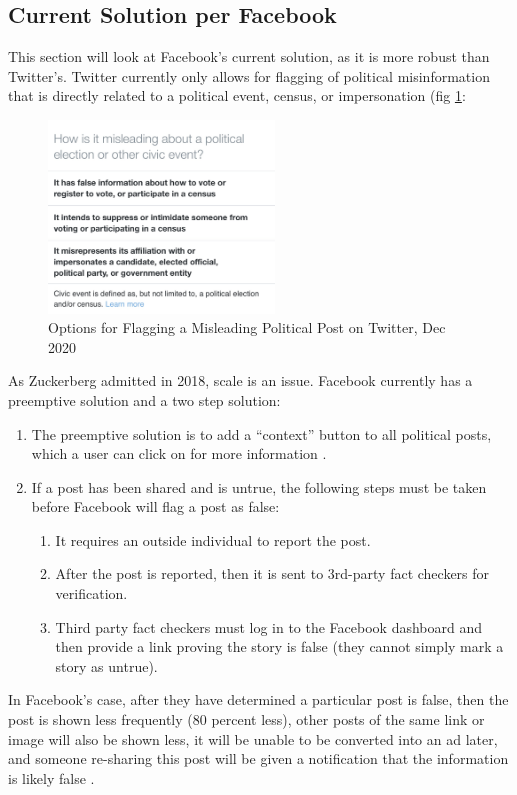 \documentclass[NETN,manuscript]{stjour-new}
\begin{document}
\subsection{Current Solution per Facebook}
This section will look at Facebook's current solution, as it is more robust than Twitter's. Twitter currently only allows for flagging of political misinformation that is directly related to a political event, census, or impersonation (fig \ref{img:TwitterPolitics}:
\begin{figure}[htp]
    \centering
    \includegraphics[width=6cm]{TwitterPolitics.jpg}
    \caption{Options for Flagging a Misleading Political Post on Twitter, Dec 2020}
    \label{img:TwitterPolitics}
\end{figure}

As Zuckerberg admitted in 2018, scale is an issue. Facebook currently has a preemptive solution and a two step solution:
\renewcommand{\labelenumii}{\Roman{enumii}}
\begin{enumerate}
\item The preemptive solution is to add a “context” button to all political posts, which a user can click on for more information \citep{smith2018designing}.
 \item If a post has been shared and is untrue, the following steps must be taken before Facebook will flag a post as false:
 \begin{enumerate}
     \item It requires an outside individual to report the post. 
     \item After the post is reported, then it is  sent to 3rd-party fact checkers for verification. 
     \item Third party fact checkers must log in to the Facebook dashboard and then provide a link proving the story is false (they cannot simply mark a story as untrue).
 \end{enumerate}
 \end{enumerate}
 
 In Facebook’s case, after they have determined a particular post is false, then the post is shown less frequently (80 percent less), other posts of the same link or image will also be shown less, it will be unable to be converted into an ad later, and someone re-sharing this post will be given a notification that the information is likely false \citep{owen2016clamping,facebook2020fact}.
 
\end{document}
